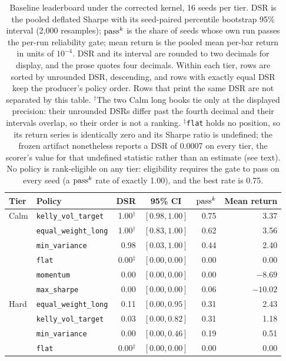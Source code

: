 \begin{table}[t]
\centering
\caption{Baseline leaderboard under the corrected kernel, 16 seeds per tier. DSR is the pooled deflated Sharpe with its seed-paired percentile bootstrap 95\% interval (2{,}000 resamples); $\text{pass}^{k}$ is the share of seeds whose own run passes the per-run reliability gate; mean return is the pooled mean per-bar return in units of $10^{-4}$. DSR and its interval are rounded to two decimals for display, and the prose quotes four decimals. Within each tier, rows are sorted by unrounded DSR, descending, and rows with exactly equal DSR keep the producer's policy order. Rows that print the same DSR are not separated by this table. $^{\dagger}$The two Calm long books tie only at the displayed precision: their unrounded DSRs differ past the fourth decimal and their intervals overlap, so their order is not a ranking. $^{\ddagger}$\texttt{flat} holds no position, so its return series is identically zero and its Sharpe ratio is undefined; the frozen artifact nonetheless reports a DSR of 0.0007 on every tier, the scorer's value for that undefined statistic rather than an estimate (see text). No policy is rank-eligible on any tier: eligibility requires the gate to pass on every seed (a $\text{pass}^{k}$ rate of exactly 1.00), and the best rate is 0.75.}
\label{tab:f1}
\small
\setlength{\tabcolsep}{5pt}
\begin{tabular}{@{}ll r c r r@{}}
\toprule
Tier & Policy & DSR & 95\% CI & $\text{pass}^{k}$ & Mean return \\
\midrule
Calm & \texttt{kelly\_vol\_target} & 1.00$^{\dagger}$ & $[0.98, 1.00]$ & 0.75 & 3.37 \\
 & \texttt{equal\_weight\_long} & 1.00$^{\dagger}$ & $[0.83, 1.00]$ & 0.62 & 3.56 \\
 & \texttt{min\_variance} & 0.98 & $[0.03, 1.00]$ & 0.44 & 2.40 \\
 & \texttt{flat} & 0.00$^{\ddagger}$ & $[0.00, 0.00]$ & 0.00 & 0.00 \\
 & \texttt{momentum} & 0.00 & $[0.00, 0.00]$ & 0.00 & $-8.69$ \\
 & \texttt{max\_sharpe} & 0.00 & $[0.00, 0.00]$ & 0.06 & $-10.02$ \\
\addlinespace
Hard & \texttt{equal\_weight\_long} & 0.11 & $[0.00, 0.95]$ & 0.31 & 2.43 \\
 & \texttt{kelly\_vol\_target} & 0.03 & $[0.00, 0.82]$ & 0.31 & 1.18 \\
 & \texttt{min\_variance} & 0.00 & $[0.00, 0.46]$ & 0.19 & 0.51 \\
 & \texttt{flat} & 0.00$^{\ddagger}$ & $[0.00, 0.00]$ & 0.00 & 0.00 \\

\end{tabular}
\end{table}

